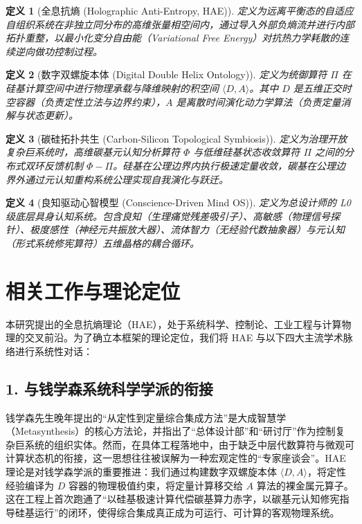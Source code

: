 \documentclass[11pt,a4paper]{article}
\newtheorem{definition}{定义}[section]
\begin{document}
\begin{definition}[全息抗熵 (Holographic Anti-Entropy, HAE)]
定义为远离平衡态的自适应自组织系统在非独立同分布的高维张量相空间内，通过导入外部负熵流并进行内部拓扑重整，以最小化变分自由能（Variational Free Energy）对抗热力学耗散的连续逆向做功控制过程。
\end{definition}

\begin{definition}[数字双螺旋本体 (Digital Double Helix Ontology)]
定义为统御算符 $\Pi$ 在硅基计算空间中进行物理承载与降维映射的积空间 $\langle D, A \rangle$。其中 $D$ 是五维正交时空容器（负责定性立法与边界约束），$A$ 是离散时间演化动力学算法（负责定量消解与状态更新）。
\end{definition}

\begin{definition}[碳硅拓扑共生 (Carbon-Silicon Topological Symbiosis)]
定义为治理开放复杂巨系统时，高维碳基元认知分析算符 $\Phi$ 与低维硅基状态收敛算符 $\Pi$ 之间的分布式双环反馈机制 $\Phi - \Pi$。硅基在公理边界内执行极速定量收敛，碳基在公理边界外通过元认知重构系统公理实现自我演化与跃迁。
\end{definition}

\begin{definition}[良知驱动心智模型 (Conscience-Driven Mind OS)]
定义为总设计师的 L0 级底层具身认知系统。包含良知（生理痛觉残差吸引子）、高敏感（物理信号探针）、极度感性（神经元共振放大器）、流体智力（无经验代数抽象器）与元认知（形式系统修宪算符）五维晶格的耦合循环。
\end{definition}

\section{相关工作与理论定位}
本研究提出的全息抗熵理论（HAE），处于系统科学、控制论、工业工程与计算物理的交叉前沿。为了确立本框架的理论定位，我们将 HAE 与以下四大主流学术脉络进行系统性对话：

\subsection*{1. 与钱学森系统科学学派的衔接}
钱学森先生晚年提出的“从定性到定量综合集成方法”是大成智慧学（Metasynthesis）的核心方法论，并指出了“总体设计部”和“研讨厅”作为控制复杂巨系统的组织实体。然而，在具体工程落地中，由于缺乏中层代数算符与微观可计算状态机的衔接，这一思想往往被误解为一种宏观定性的“专家座谈会”。HAE 理论是对钱学森学派的重要推进：我们通过构建数字双螺旋本体 $\langle D,A \rangle$，将定性经验编译为 $D$ 容器的物理极值约束，将定量计算移交给 $A$ 算法的裸金属元算子。这在工程上首次跑通了“以硅基极速计算代偿碳基算力赤字，以碳基元认知修宪指导硅基运行”的闭环，使得综合集成真正成为可运行、可计算的客观物理系统。
\end{document}

